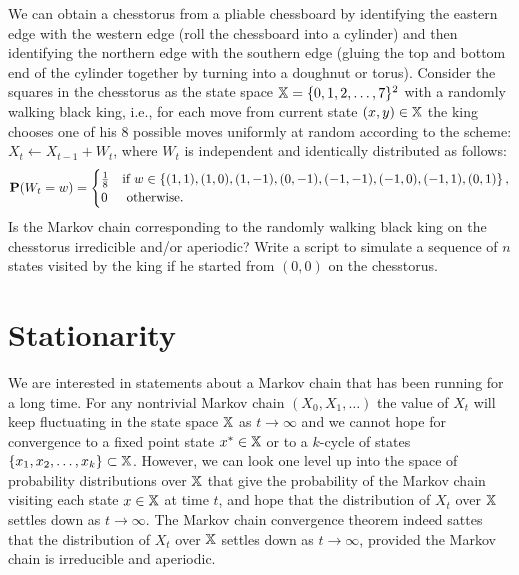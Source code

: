 \begin{exercise}\label{EXR:KingRWChessTorus}
We can obtain a chesstorus from a pliable chessboard by identifying the eastern edge with the western edge (roll the chessboard into a cylinder) and then identifying the northern edge with the southern edge (gluing the top and bottom end of the cylinder together by turning into a doughnut or torus).  Consider the squares in the chesstorus as the state space $\mathbb{X} = \{ 0,1,2,\ldots,7\}^2$ with a randomly walking black king, i.e., for each move from current state $(x,y) \in \mathbb{X}$ the king chooses one of his $8$ possible moves uniformly at random according to the scheme: $X_t \gets X_{t-1}+ W_t$, where $W_t$ is independent and identically distributed as follows:
\[ 
\mathbf{P}(W_t = w) = 
\begin{cases}
\frac{1}{8} & \text{if } w \in \left\{ (1,1), (1,0), (1,-1), (0,-1), (-1,-1), (-1,0), (-1,1), (0,1) \right\} , \\
0 & \text{ otherwise}.
\end{cases}
\]
Is the Markov chain corresponding to the randomly walking black king on the chesstorus irredicible and/or aperiodic?  Write a \Matlab script to simulate a sequence of $n$ states visited by the king if he started from $(0,0)$ on the chesstorus.
\end{exercise}

\section{Stationarity}\label{S:Stationarity}

We are interested in statements about a Markov chain that has been running for a long time.  
For any nontrivial Markov chain $(X_0,X_1,\ldots)$ the value of $X_t$ will keep fluctuating in the state space $\mathbb{X}$ as $t \to \infty$ and we cannot hope for convergence to a fixed point state $x^* \in \mathbb{X}$ or to a $k$-cycle of states $\{x_1,x_2,\ldots,x_k\} \subset \mathbb{X}$.  However, we can look one level up into the space of probability distributions over $\mathbb{X}$ that give the probability of the Markov chain visiting each state $x \in \mathbb{X}$ at time $t$, and hope that the distribution of $X_t$ over $\mathbb{X}$ settles down as $t \to \infty$.  The Markov chain convergence theorem indeed sattes that the distribution of $X_t$ over $\mathbb{X}$ settles down as $t \to \infty$, provided the Markov chain is irreducible and aperiodic.

